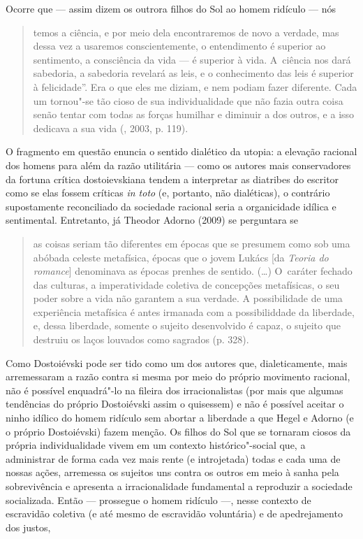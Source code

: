 Ocorre que --- assim dizem os outrora filhos do Sol ao homem ridículo ---
nós

\begin{quote}
temos a ciência, e por meio dela encontraremos de novo a verdade, mas
dessa vez a usaremos conscientemente, o entendimento é superior ao
sentimento, a consciência da vida --- é superior à vida. A~ciência nos
dará sabedoria, a sabedoria revelará as leis, e o conhecimento das leis
é superior à felicidade''. Era o que eles me diziam, e nem podiam fazer
diferente. Cada um tornou"-se tão cioso de sua individualidade que não
fazia outra coisa senão tentar com todas as forças humilhar e diminuir a
dos outros, e a isso dedicava a sua vida (, 2003, p. 119).
\end{quote}

O fragmento em questão enuncia o sentido dialético da utopia: a elevação
racional dos homens para além da razão utilitária --- como os autores
mais conservadores da fortuna crítica dostoievskiana tendem a
interpretar as diatribes do escritor como se elas fossem críticas
\emph{in toto} (e, portanto, não dialéticas), o contrário supostamente
reconciliado da sociedade racional seria a organicidade idílica e
sentimental. Entretanto, já Theodor Adorno (2009) se perguntara se

\begin{quote}
as coisas seriam tão diferentes em épocas que se presumem como sob uma
abóbada celeste metafísica, épocas que o jovem Lukács {[}da \emph{Teoria
do romance}{]} denominava as épocas prenhes de sentido. (\ldots) O~caráter
fechado das culturas, a imperatividade coletiva de concepções
metafísicas, o seu poder sobre a vida não garantem a sua verdade. A
possibilidade de uma experiência metafísica é antes irmanada com a
possibiliddade da liberdade, e, dessa liberdade, somente o sujeito
desenvolvido é capaz, o sujeito que destruiu os laços louvados como
sagrados (p. 328).
\end{quote}

Como Dostoiévski pode ser tido como um dos autores que, dialeticamente,
mais arremessaram a razão contra si mesma por meio do próprio movimento
racional, não é possível enquadrá"-lo na fileira dos irracionalistas (por
mais que algumas tendências do próprio Dostoiévski assim o quisessem) e
não é possível aceitar o ninho idílico do homem ridículo sem abortar a
liberdade a que Hegel e Adorno (e o próprio Dostoiévski) fazem menção.
Os filhos do Sol que se tornaram ciosos da própria individualidade vivem
em um contexto histórico"-social que, a administrar de forma cada vez
mais rente (e introjetada) todas e cada uma de nossas ações, arremessa
os sujeitos uns contra os outros em meio à sanha pela sobrevivência e
apresenta a irracionalidade fundamental a reproduzir a sociedade
socializada. Então --- prossegue o homem ridículo ---, nesse contexto de
escravidão coletiva (e até mesmo de escravidão voluntária) e de
apedrejamento dos justos,

